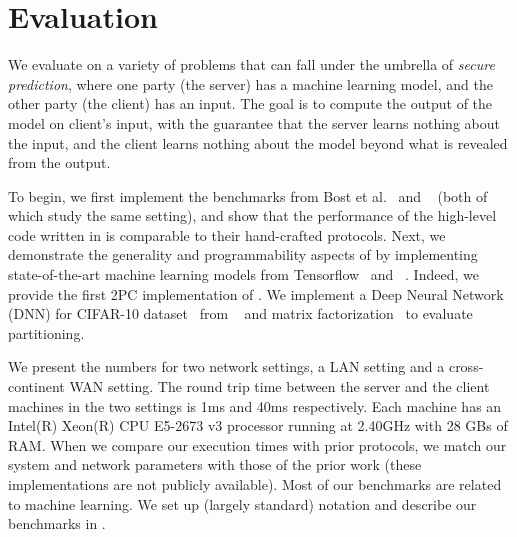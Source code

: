 \section{Evaluation}
\label{sec:eval}
We evaluate \tool on a variety of problems that can fall under the umbrella of {\it secure prediction}, where one
party (the server) has a machine learning model, and the other party
(the client) has an input. The goal is to compute the output of the
model on client's input, with the guarantee that the server
learns nothing about the input, and the client learns nothing
about the model beyond what is revealed from the output.

To begin, we first implement the benchmarks from Bost et al.~\cite{shafindss}
and \minion~\cite{minionn} (both of which study the same setting),
and show that the performance of the high-level code written in \tool
is comparable to their hand-crafted protocols.
%
Next, we demonstrate the generality and programmability aspects of
\tool by implementing state-of-the-art machine learning models from
Tensorflow~\cite{tensorflow} and \bonsai~\cite{bonsai}. Indeed, we
provide the first 2PC implementation of \bonsai.
%
We
implement a Deep Neural Network (DNN) for CIFAR-10
dataset~\cite{cifar} from \minion~\cite{minionn} and matrix factorization~\cite{valeriaMatrix}
to evaluate partitioning.

We present the numbers for two network settings, a LAN setting and
a cross-continent WAN setting. The round trip time between the server
and the client machines in the two settings is 1ms and 40ms respectively. Each
machine has an Intel(R) Xeon(R) CPU E5-2673 v3 processor running at
2.40GHz with 28 GBs of RAM. When we compare our execution times with prior protocols, we match our system and network parameters with those of the prior work (these implementations are not publicly available).
%
Most of our benchmarks
are related to machine learning. We set up (largely standard) notation and describe our benchmarks in .

